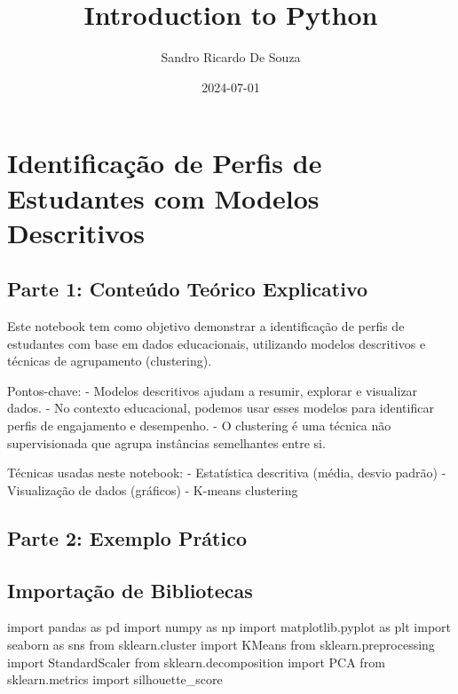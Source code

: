 \documentclass[
  letterpaper,
  DIV=11,
  numbers=noendperiod]{scrartcl}
\title{Introduction to Python}
\author{Sandro Ricardo De Souza}
\date{2024-07-01}
\newenvironment{Shaded}{\begin{snugshade}}{\end{snugshade}}
\newcommand{\ImportTok}[1]{\textcolor[rgb]{0.00,0.46,0.62}{#1}}
\newcommand{\NormalTok}[1]{\textcolor[rgb]{0.00,0.23,0.31}{#1}}
\renewcommand*\contentsname{Table of contents}
\newcommand\contentsname{Table of contents}
\begin{document}
\maketitle

\renewcommand*\contentsname{Table of contents}
{
\hypersetup{linkcolor=}
\setcounter{tocdepth}{2}
\tableofcontents
}

\section{Identificação de Perfis de Estudantes com Modelos
Descritivos}\label{identificauxe7uxe3o-de-perfis-de-estudantes-com-modelos-descritivos}

\subsection{Parte 1: Conteúdo Teórico
Explicativo}\label{parte-1-conteuxfado-teuxf3rico-explicativo}

Este notebook tem como objetivo demonstrar a identificação de perfis de
estudantes com base em dados educacionais, utilizando modelos
descritivos e técnicas de agrupamento (clustering).

Pontos-chave: - Modelos descritivos ajudam a resumir, explorar e
visualizar dados. - No contexto educacional, podemos usar esses modelos
para identificar perfis de engajamento e desempenho. - O clustering é
uma técnica não supervisionada que agrupa instâncias semelhantes entre
si.

Técnicas usadas neste notebook: - Estatística descritiva (média, desvio
padrão) - Visualização de dados (gráficos) - K-means clustering

\subsection{Parte 2: Exemplo Prático}\label{parte-2-exemplo-pruxe1tico}

\subsection{Importação de
Bibliotecas}\label{importauxe7uxe3o-de-bibliotecas}

\begin{Shaded}
\begin{Highlighting}[]
\ImportTok{import}\NormalTok{ pandas }\ImportTok{as}\NormalTok{ pd}
\ImportTok{import}\NormalTok{ numpy }\ImportTok{as}\NormalTok{ np}
\ImportTok{import}\NormalTok{ matplotlib.pyplot }\ImportTok{as}\NormalTok{ plt}
\ImportTok{import}\NormalTok{ seaborn }\ImportTok{as}\NormalTok{ sns}
\ImportTok{from}\NormalTok{ sklearn.cluster }\ImportTok{import}\NormalTok{ KMeans}
\ImportTok{from}\NormalTok{ sklearn.preprocessing }\ImportTok{import}\NormalTok{ StandardScaler}
\ImportTok{from}\NormalTok{ sklearn.decomposition }\ImportTok{import}\NormalTok{ PCA}
\ImportTok{from}\NormalTok{ sklearn.metrics }\ImportTok{import}\NormalTok{ silhouette\_score}
\end{Highlighting}
\end{Shaded}
\end{document}
